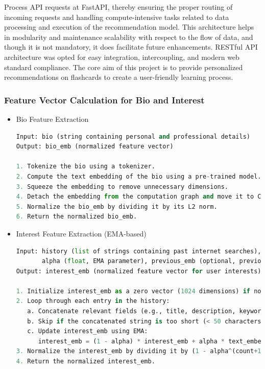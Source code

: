 \documentclass{article}
\begin{document}
Process API requests at FastAPI, thereby ensuring the proper routing of incoming requests and handling compute-intensive tasks related to data processing and execution of the recommendation model. This architecture helps in modularity and maintenance scalability with respect to the flow of data, and though it is not mandatory, it does facilitate future enhancements. RESTful API architecture was opted for easy integration, intercoupling, and modern web standard compliance. The core aim of this project is to provide personalized recommendations on flashcards to create a user-friendly learning process.

\subsubsection{Feature Vector Calculation for Bio and Interest}
\begin{itemize}
\item Bio Feature Extraction
\begin{lstlisting}[language=Python]
Input: bio (string containing personal and professional details)
Output: bio_emb (normalized feature vector)

1. Tokenize the bio using a tokenizer.
2. Compute the text embedding of the bio using a pre-trained model.
3. Squeeze the embedding to remove unnecessary dimensions.
4. Detach the embedding from the computation graph and move it to CPU.
5. Normalize the bio_emb by dividing it by its L2 norm.
6. Return the normalized bio_emb.
\end{lstlisting}

\item Interest Feature Extraction (EMA-based)
\begin{lstlisting}[language=Python]
Input: history (list of strings containing past internet searches), 
       alpha (float, EMA parameter), previous_emb (optional, previous embedding for EMA)
Output: interest_emb (normalized feature vector for user interests)

1. Initialize interest_emb as a zero vector (1024 dimensions) if no previous_emb is provided.
2. Loop through each entry in the history:
   a. Concatenate relevant fields (e.g., title, description, keywords).
   b. Skip if the concatenated string is too short (< 50 characters).
   c. Update interest_emb using EMA:
      interest_emb = (1 - alpha) * interest_emb + alpha * text_embedding_of_entry.
3. Normalize the interest_emb by dividing it by (1 - alpha^(count+1)).
4. Return the normalized interest_emb.
\end{lstlisting}
\end{itemize}
\end{document}
